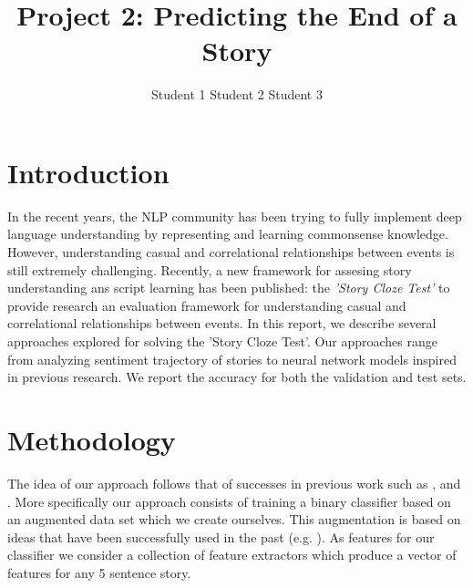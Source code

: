 \documentclass{article}
\title{Project 2: Predicting the End of a Story}
\author{Student 1 \qquad Student 2 \qquad Student 3}
\begin{document}

\maketitle



\section{Introduction}
\label{sec:intro}

In the recent years, the NLP community has been trying to fully implement deep
language understanding by representing and learning commonsense knowledge.
However, understanding casual and correlational relationships between events is
still extremely challenging. Recently, a new framework for assesing story
understanding ans script learning has been published: the {\it 'Story Cloze
    Test'} to provide research an evaluation framework for understanding casual
and correlational relationships between events. In this report, we describe
several approaches explored for solving the 'Story Cloze Test'. Our approaches
range from analyzing sentiment trajectory of stories to neural network models
inspired in previous research. We report the accuracy for both the validation
and test sets.


\section{Methodology}
\label{sec:general}
The idea of our approach follows that of successes in previous work such as \cite{UWNLP}, \cite{Goel} and \cite{COGCOMP}. More specifically our approach consists of training a binary classifier based on an augmented data set which we create ourselves. This augmentation is based on ideas that have been successfully used in the past (e.g. \cite{LSTMClassifier}\cite{SENTENCE_EMB}). As features for our classifier we consider a collection of feature extractors which produce a vector of features for any 5 sentence story.
\end{document}
